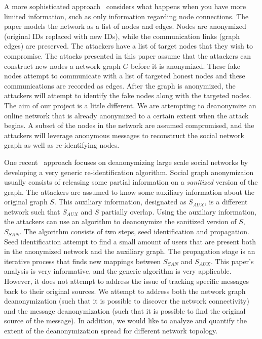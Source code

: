 \documentclass[10pt, twocolumn]{article}
\begin{document}
A more sophisticated approach~\cite{backstrom2007wherefore} considers what happens when you have more limited information, such as only information regarding node connections. The paper models the network as a list of nodes and edges. Nodes are anonymized (original IDs replaced with new IDs), while the communication links (graph edges) are preserved. The attackers have a list of target nodes that they wish to compromise.
The attacks presented in this paper assume that the attackers can construct new nodes a network graph $G$ before it is anonymized. These fake nodes attempt to communicate with a list of targeted honest nodes and these communications are recorded as edges. After the graph is anonymized, the attackers will attempt to identify the fake nodes along with the targeted nodes. 
The aim of our project is a little different. We are attempting to deanonymize an online network that is already anonymized to a certain extent when the attack begins. A subset of the nodes in the network are assumed compromised, and the attackers will leverage anonymous messages to reconstruct the social network graph as well as re-identifying nodes. 

One recent~\cite{narayanan2009anonymizing} approach focuses on deanonymizing large scale social networks by developing a very generic re-identification algorithm. Social graph anonymizaion usually consists of releasing some partial information on a \emph{sanitized} version of the graph. 
The attackers are assumed to know some auxiliary information about the original graph $S$. This auxiliary information, designated as $S_{AUX}$, is a different network such that $S_{AUX}$ and $S$ partially overlap. Using the auxiliary information, the attackers can use an algorithm to deanonymize the sanitized version of $S$, $S_{SAN}$.
The algorithm consists of two steps, seed identification and propagation. Seed identification attempt to find a small amount of users that are present both in the anonymized network and the auxiliary graph. The propagation stage is an iterative process that finds new mappings between $S_{SAN}$ and $S_{AUX}$. This paper's analysis is very informative, and the generic algorithm is very applicable. However, it does not attempt to address the issue of tracking specific messages back to their original sources. We attempt to address both the network graph deanonymization (such that it is possible to discover the network connectivity) and the message deanonymization (such that it is possible to find the original source of the message). In addition, we would like to analyze and quantify the extent of the deanonymization spread for different network topology.
\end{document}
